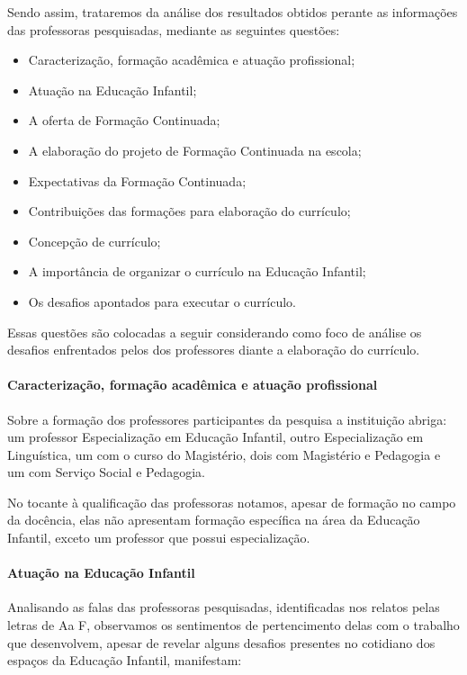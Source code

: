 \begin{refsection}
    Sendo assim, trataremos da análise dos resultados obtidos perante as informações das professoras pesquisadas, mediante as seguintes questões:

    \begin{itemize}
        \item Caracterização, formação acadêmica e atuação profissional;  
        \item Atuação na Educação Infantil;  
        \item A oferta de Formação Continuada;  
        \item A elaboração do projeto de Formação Continuada na escola;  
        \item Expectativas da Formação Continuada;  
        \item Contribuições das formações para elaboração do currículo;  
        \item Concepção de currículo;  
        \item A importância de organizar o currículo na Educação Infantil; 
        \item Os desafios apontados para executar o currículo.  
    \end{itemize}

    Essas questões são colocadas a seguir considerando como foco de análise os desafios enfrentados pelos dos professores diante a elaboração do currículo. 

    \paragraph{Caracterização, formação acadêmica e atuação profissional} Sobre a formação dos professores participantes da pesquisa a instituição abriga: um professor Especialização em Educação Infantil, outro Especialização em Linguística, um com o curso do Magistério, dois com Magistério e Pedagogia e um com Serviço Social e Pedagogia. 

    No tocante à qualificação das professoras notamos, apesar de formação no campo da docência, elas não apresentam formação específica na área da Educação Infantil, exceto um professor que possui especialização. 

    \paragraph{Atuação na Educação Infantil} Analisando as falas das professoras pesquisadas, identificadas nos relatos pelas letras de Aa F, observamos os sentimentos de pertencimento delas com o trabalho que desenvolvem, apesar de revelar alguns desafios presentes no cotidiano dos espaços da Educação Infantil, manifestam:


\end{refsection}
